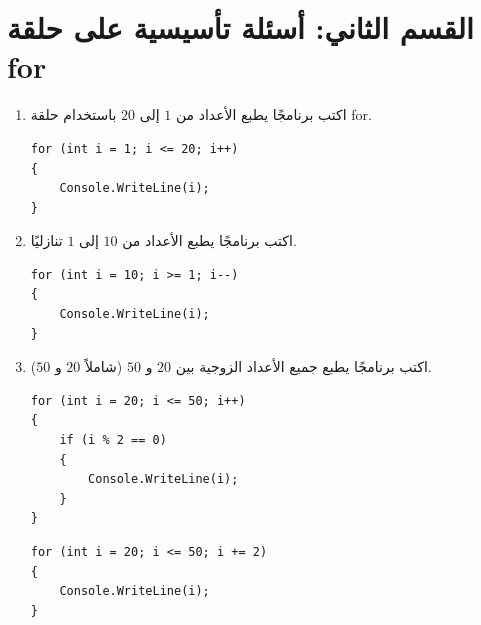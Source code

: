 \documentclass[14pt]{extarticle}
\begin{document}
\clearpage
\section*{القسم الثاني: أسئلة تأسيسية على حلقة \textenglish{for}}

\begin{enumerate}[resume, itemsep=1em]

\item اكتب برنامجًا يطبع الأعداد من $1$ إلى $20$ باستخدام حلقة \textenglish{for}.
\ifwithsols
\begin{boxSolution}
\begin{english}
\begin{verbatim}
for (int i = 1; i <= 20; i++)
{
    Console.WriteLine(i);
}
\end{verbatim}
\end{english}
\end{boxSolution}
\fi
\filbreak

\item اكتب برنامجًا يطبع الأعداد من $10$ إلى $1$ تنازليًا.
\ifwithsols
\begin{boxSolution}
\begin{english}
\begin{verbatim}
for (int i = 10; i >= 1; i--)
{
    Console.WriteLine(i);
}
\end{verbatim}
\end{english}
\end{boxSolution}
\fi
\filbreak

\item اكتب برنامجًا يطبع جميع الأعداد الزوجية بين $20$ و $50$ (شاملاً $20$ و $50$).
\ifwithsols
\begin{boxSolution}[1]
\begin{english}
\begin{verbatim}
for (int i = 20; i <= 50; i++)
{
    if (i % 2 == 0)
    {
        Console.WriteLine(i);
    }
}
\end{verbatim}
\end{english}
\end{boxSolution}

\filbreak

\begin{boxSolution}[2]
\begin{english}
\begin{verbatim}
for (int i = 20; i <= 50; i += 2)
{
    Console.WriteLine(i);
}
\end{verbatim}
\end{english}
\end{boxSolution}
\fi
\filbreak


\end{enumerate}
\end{document}
